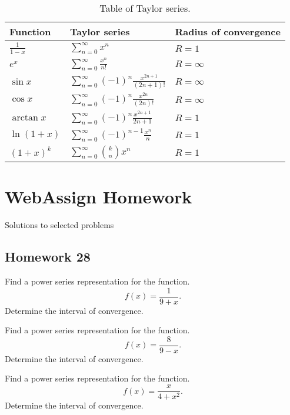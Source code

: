 \begin{table}
\centering
\begin{tabular}{|l|l|l|}
\hline
Function&Taylor series&Radius of convergence\\
\hline
$\displaystyle\frac{1}{1-x}$&
$\displaystyle\sum_{n=0}^\infty x^n$&
$R=1$\\
$\displaystyle e^x$&
$\displaystyle\sum_{n=0}^\infty \frac{x^n}{n!}$&
$R=\infty$\\
$\displaystyle\sin x$&
$\displaystyle\sum_{n=0}^\infty (-1)^n\frac{x^{2n+1}}{(2n+1)!}$&
$R=\infty$\\
$\displaystyle\cos x$&
$\displaystyle\sum_{n=0}^\infty(-1)^n\frac{x^{2n}}{(2n)!}$&
$R=\infty$\\
$\displaystyle\arctan x$&
$\displaystyle\sum_{n=0}^\infty(-1)^n\frac{x^{2n+1}}{2n+1}$&
$R=1$\\
$\displaystyle\ln(1+x)$&
$\displaystyle\sum_{n=0}^\infty(-1)^{n-1}\frac{x^n}{n}$&
$R=1$\\
$\displaystyle(1+x)^k$&
$\displaystyle\sum_{n=0}^\infty\binom k n x^n$&
$R=1$\\
\hline
\end{tabular}
\caption{Table of Taylor series.}
\label{tab:taylor-series}
\end{table}

\section{WebAssign Homework}
Solutions to selected problems
\subsection{Homework 28}
\begin{problem}[WebAssign HW 28, \# 1]
Find a power series representation for the function.
\[
f(x)=\frac{1}{9+x}.
\]
Determine the interval of convergence.
\end{problem}

\begin{problem}[WebAssign HW 28, \# 2]
Find a power series representation for the function.
\[
f(x)=\frac{8}{9-x}.
\]
Determine the interval of convergence.
\end{problem}

\begin{problem}[WebAssign HW 28, \# 3]
Find a power series representation for the function.
\[
f(x)=\frac{x}{4+x^2}.
\]
Determine the interval of convergence.
\end{problem}

